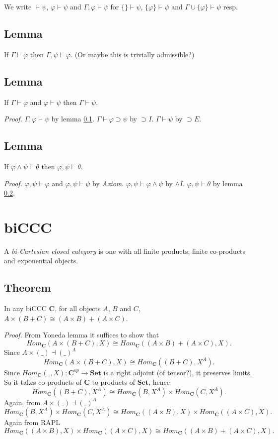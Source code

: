 \documentclass[a4paper,12pt]{paper}
\begin{document}
We write $\vdash \psi$, $\varphi \vdash \psi$ and $\Gamma, \varphi \vdash \psi$ for $\{\} \vdash \psi$, $\{\varphi\} \vdash \psi$ and $\Gamma \cup \{\varphi\} \vdash \psi$ resp.

\subsection{Lemma}\label{weakening} If $\Gamma \vdash \varphi$ then $\Gamma, \psi \vdash \varphi$. (Or maybe this is trivially admissible?)

\subsection{Lemma}\label{cut} If $\Gamma \vdash \varphi$ and $\varphi \vdash \psi$ then $\Gamma \vdash \psi$.

\textit{Proof.} $\Gamma, \varphi \vdash \psi$ by lemma \ref{weakening}. $\Gamma \vdash \varphi \supset \psi$ by $\supset I$. $\Gamma \vdash \psi$ by $\supset E$.

\subsection{Lemma}\label{context} If $\varphi \land \psi \vdash \theta$ then $\varphi, \psi \vdash \theta$.

\textit{Proof.} $\varphi,\psi \vdash \varphi$ and $\varphi,\psi \vdash \psi$ by \textit{Axiom}. $\varphi,\psi \vdash \varphi \land \psi$ by $\land I$. $\varphi,\psi \vdash \theta$ by lemma \ref{cut}.

\section{biCCC} A \emph{bi-Cartesian closed category} is one with all finite products, finite co-products and exponential objects.

\subsection{Theorem}\label{dist} In any biCCC $\mathbf{C}$, for all objects $A$, $B$ and $C$, $A \times (B + C) \cong (A \times B) +‌(A \times C)$.

\textit{Proof.} From Yoneda lemma it suffices to show that
\[ Hom_{\mathbf{C}}(A \times (B + C), X) \cong Hom_{\mathbf{C}}((A \times B) +‌(A \times C), X) .\]
Since $A \times (\_) \dashv (\_)^A$
\[ Hom_{\mathbf{C}}(A \times (B + C), X) \cong Hom_{\mathbf{C}}((B + C), X^A) .\]
Since $Hom_{\mathbf{C}}(\_, X) : \mathbf{C}^{op} \longrightarrow \mathbf{Set}$ is a right adjoint (of tensor?), it preserves limits. So it takes co-products of $\mathbf{C}$ to products of $\mathbf{Set}$, hence
\[ Hom_{\mathbf{C}}((B + C), X^A) \cong Hom_\mathbf{C}(B, X^A) \times Hom_\mathbf{C}(C, X^A). \]
Again, from $A \times (\_) \dashv (\_)^A$
\[  Hom_\mathbf{C}(B, X^A) \times Hom_\mathbf{C}(C, X^A) \cong  Hom_\mathbf{C}((A \times B), X) \times Hom_\mathbf{C}((A \times C), X). \]
Again from RAPL
\[ Hom_\mathbf{C}((A \times B), X) \times Hom_\mathbf{C}((A \times C), X) \cong Hom_{\mathbf{C}}((A \times B) +‌(A \times C), X). \]
\end{document}
